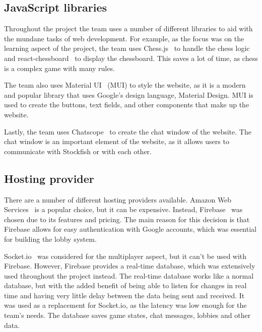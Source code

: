 \subsection{JavaScript libraries}\label{subsec:libraries}

Throughout the project the team uses a number of different libraries to aid with the mundane tasks of web development.
For example, as the focus was on the learning aspect of the project, the team uses Chess.js~\cite{chess.js} to handle
the chess logic and react-chessboard~\cite{react-chessboard} to display the chessboard.
This saves a lot of time, as chess is a complex game with many rules.

The team also uses Material UI~\cite{mui} (MUI) to style the website, as it is a modern and popular library that
uses Google's design language, Material Design.
MUI is used to create the buttons, text fields, and other components that make up the website.

Lastly, the team uses Chatscope~\cite{chatscope} to create the chat window of the website.
The chat window is an important element of the website, as it allows users to communicate with Stockfish or with each
other.

\subsection{Hosting provider}\label{subsec:hosting}

There are a number of different hosting providers available.
Amazon Web Services~\cite{aws} is a popular choice, but it can be expensive.
Instead, Firebase~\cite{firebase} was chosen due to its features and pricing.
The main reason for this decision is that Firebase allows for easy authentication with Google accounts, which was
essential for building the lobby system.

Socket.io~\cite{socket.io} was considered for the multiplayer aspect, but it can't be used with Firebase.
However, Firebase provides a real-time database, which was extensively used throughout the project instead.
The real-time database works like a normal database, but with the added benefit of being able to listen for changes in
real time and having very little delay between the data being sent and received.
It was used as a replacement for Socket.io, as the latency was low enough for the team's needs.
The database saves game states, chat messages, lobbies and other data.

